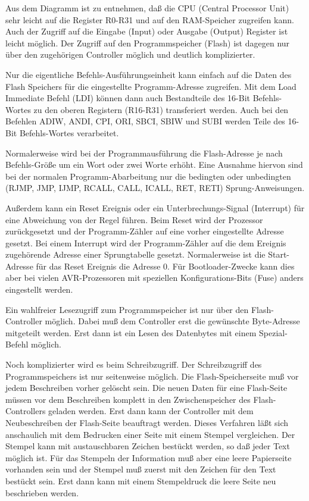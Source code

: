Aus dem Diagramm ist zu entnehmen, daß die
CPU (Central Processor Unit) sehr leicht auf die Register R0-R31 und
auf den RAM-Speicher zugreifen kann. Auch der Zugriff auf die
Eingabe (Input) oder Ausgabe (Output) Register ist leicht möglich.
Der Zugriff auf den Programmspeicher (Flash) ist dagegen nur über
den zugehörigen Controller möglich und deutlich komplizierter.

Nur die eigentliche Befehls-Ausführungseinheit kann einfach auf
die Daten des Flash Speichers für die eingestellte Programm-Adresse zugreifen.
Mit dem Load Immediate Befehl (LDI) können dann auch Bestandteile des 
16-Bit Befehls-Wortes zu den oberen Registern (R16-R31) transferiert werden. 
Auch bei den Befehlen ADIW, ANDI, CPI, ORI, SBCI, SBIW und SUBI werden Teile
des 16-Bit Befehls-Wortes verarbeitet.

Normalerweise wird bei der Programmausführung die Flash-Adresse
je nach Befehls-Größe um ein Wort oder zwei Worte erhöht.
Eine Ausnahme hiervon sind bei der normalen Programm-Abarbeitung nur
die bedingten oder unbedingten (RJMP, JMP, IJMP, RCALL, CALL, ICALL, RET, RETI) Sprung-Anweisungen.

Außerdem kann ein Reset Ereignis oder ein Unterbrechungs-Signal (Interrupt)
für eine Abweichung von der Regel führen.
Beim Reset wird der Prozessor zurückgesetzt und der Programm-Zähler auf eine
vorher eingestellte Adresse gesetzt.
Bei einem Interrupt wird der Programm-Zähler auf die dem
Ereignis zugehörende Adresse einer Sprungtabelle gesetzt.
Normalerweise ist die Start-Adresse für das Reset Ereignis die Adresse 0.
Für Bootloader-Zwecke kann dies aber bei vielen AVR-Prozessoren mit speziellen
Konfigurations-Bits (Fuse) anders eingestellt werden.

Ein wahlfreier Lesezugriff zum Programmspeicher ist nur über den Flash-Controller
möglich. Dabei muß dem Controller erst die gewünschte Byte-Adresse mitgeteilt werden.
Erst dann ist ein Lesen des Datenbytes mit einem Spezial-Befehl möglich.


Noch komplizierter wird es beim Schreibzugriff. Der Schreibzugriff des Programmspeichers
ist nur seitenweise möglich. Die Flash-Speicherseite muß vor jedem Beschreiben
vorher gelöscht sein. Die neuen Daten für eine Flash-Seite müssen vor dem
Beschreiben komplett in den Zwischenspeicher des Flash-Controllers geladen werden.
Erst dann kann der Controller mit dem Neubeschreiben der Flash-Seite beauftragt werden.
Dieses Verfahren läßt sich anschaulich mit dem Bedrucken einer Seite mit einem
Stempel vergleichen. Der Stempel kann mit austauschbaren Zeichen bestückt werden,
so daß jeder Text möglich ist. Für das Stempeln der Information muß aber
eine leere Papierseite vorhanden sein und der Stempel muß zuerst mit den
Zeichen für den Text bestückt sein.
Erst dann kann mit einem Stempeldruck die leere Seite neu beschrieben werden.

